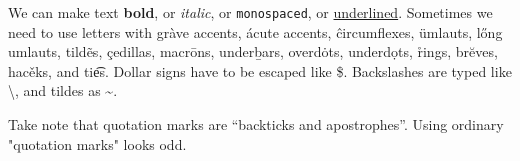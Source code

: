 \documentclass{article}
\begin{document}
We can make text \textbf{bold}, or \emph{italic}, or \texttt{monospaced}, or \underline{underlined}. Sometimes we need to use letters with gr\`{a}ve accents, \'{a}cute accents, \^{c}ircumflexes, \"{u}mlauts, l\H{o}ng umlauts, tild\~{e}s, \c{c}edillas, macr\={o}ns, under\b{b}ars, overd\.{o}ts, underd\d{o}ts, \r{r}ings, br\u{e}ves, hac\v{e}ks, and ti\t{es}. Dollar signs have to be escaped like \$. Backslashes are typed like \textbackslash, and tildes as \textasciitilde.

Take note that quotation marks are ``backticks and apostrophes''. Using ordinary "quotation marks" looks odd.
\end{document}
